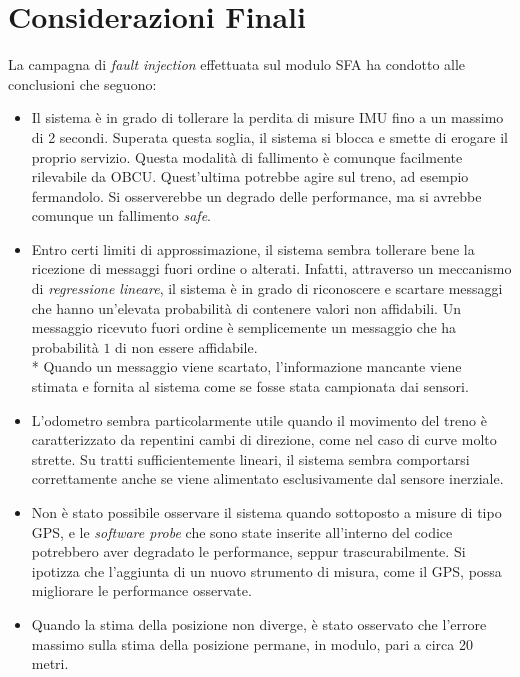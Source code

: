 \section{Considerazioni Finali}
La campagna di \emph{fault injection} effettuata sul modulo SFA ha condotto alle conclusioni che seguono:
\begin{itemize}
	\item Il sistema \`e in grado di tollerare la perdita di misure IMU fino a un massimo di 2 secondi. Superata questa soglia, il sistema si blocca e smette di erogare il proprio servizio. Questa modalit\`a di fallimento \`e comunque facilmente rilevabile da OBCU. Quest'ultima potrebbe agire sul treno, ad esempio fermandolo. Si osserverebbe un degrado delle performance, ma si avrebbe comunque un fallimento \emph{safe}.
	\item Entro certi limiti di approssimazione, il sistema sembra tollerare bene la ricezione di messaggi fuori ordine o alterati. Infatti, attraverso un meccanismo di \emph{regressione lineare}, il sistema \`e in grado di riconoscere e scartare messaggi che hanno un'elevata probabilit\`a di contenere valori non affidabili. Un messaggio ricevuto fuori ordine \`e semplicemente un messaggio che ha probabilit\`a $1$ di non essere affidabile.\\*
	Quando un messaggio viene scartato, l'informazione mancante viene stimata e fornita al sistema come se fosse stata campionata dai sensori.
	\item L'odometro sembra particolarmente utile quando il movimento del treno \`e caratterizzato da repentini cambi di direzione, come nel caso di curve molto strette. Su tratti sufficientemente lineari, il sistema sembra comportarsi correttamente anche se viene alimentato esclusivamente dal sensore inerziale.
	\item Non \`e stato possibile osservare il sistema quando sottoposto a misure di tipo GPS, e le \emph{software probe} che sono state inserite all'interno del codice potrebbero aver degradato le performance, seppur trascurabilmente. Si ipotizza che l'aggiunta di un nuovo strumento di misura, come il GPS, possa migliorare le performance osservate.
	\item Quando la stima della posizione non diverge, \`e stato osservato che l'errore massimo sulla stima della posizione permane, in modulo, pari a circa 20 metri.
\end{itemize}